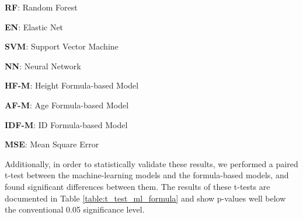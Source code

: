 \documentclass[11pt]{article}
\begin{document}
\begin{table}[h]
\caption{Mean squared residuals for each model}
\label{table:msr_models}
\begin{threeparttable}
\renewcommand{\TPTminimum}{\linewidth}
\begin{tablenotes}
\footnotesize
\item \textbf{RF}: Random Forest
\item \textbf{EN}: Elastic Net
\item \textbf{SVM}: Support Vector Machine
\item \textbf{NN}: Neural Network
\item \textbf{HF-M}: Height Formula-based Model
\item \textbf{AF-M}: Age Formula-based Model
\item \textbf{IDF-M}: ID Formula-based Model
\item \textbf{MSE}: Mean Square Error
\end{tablenotes}
\end{threeparttable}
\end{table}


Additionally, in order to statistically validate these results, we performed a paired t-test between the machine-learning models and the formula-based models, and found significant differences between them. The results of these t-tests are documented in Table \ref{table:t_test_ml_formula} and show p-values well below the conventional 0.05 significance level.
\end{document}
